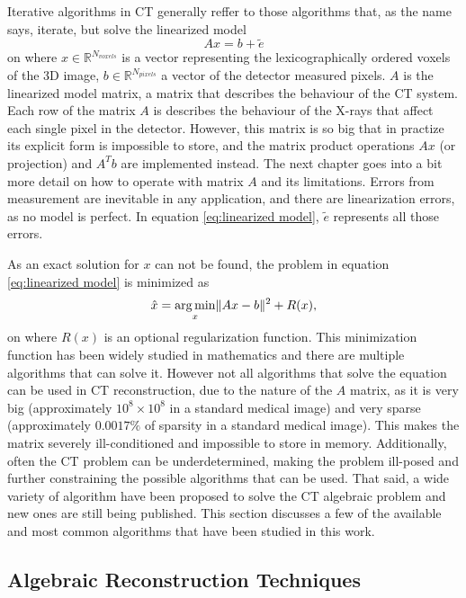 Iterative algorithms in CT generally reffer to those algorithms that, as the name says, iterate, but solve the linearized model 
\begin{equation}
Ax=b+\tilde{e} \label{eq:linearized model}
\end{equation}
on where $x\in \mathbb{R}^{N_{voxels}}$ is a vector representing the lexicographically ordered voxels of the 3D image, $b\in \mathbb{R}^{N_{pixels}} $ a vector of the detector measured pixels. $A$ is the linearized model matrix, a matrix that describes the behaviour of the CT system. Each row of the matrix $A$ is describes the behaviour of the X-rays that affect each single pixel in the detector. However, this matrix is so big that in practize its explicit form is impossible to store, and the matrix product operations $Ax$ (or projection) and $A^Tb$ are implemented instead. The next chapter goes into a bit more detail on how to operate with matrix $A$ and its limitations. Errors from measurement are inevitable in any application, and there are linearization errors, as no model is perfect. In equation \ref{eq:linearized model}, $\tilde{e}$ represents all those errors.

As an exact solution for $x$ can not be found, the problem in equation \ref{eq:linearized model} is minimized as
\begin{equation}
\hat{x}=\mathop{\mathrm{arg\,min}}_x \lVert Ax-b\rVert^2+R(x),\label{eq:THE equation}
\end{equation}
on where $R(x)$ is an optional regularization function. This minimization function has been widely studied in mathematics and there are multiple algorithms that can solve it. However not all algorithms that solve the equation can be used in CT reconstruction, due to the nature of the $A$ matrix, as it is very big (approximately $10^8\times 10^8$ in a standard medical image) and very sparse (approximately $0.0017\%$ of sparsity in a standard medical image). This makes the matrix severely ill-conditioned and impossible to store in memory. Additionally, often the CT problem can be underdetermined, making the problem ill-posed and further constraining the possible algorithms that can be used. That said, a wide variety of algorithm have been proposed to solve the CT algebraic problem and new ones are still being published. This section discusses a few of the available and most common algorithms that have been studied in this work.


\subsection{Algebraic Reconstruction Techniques}

